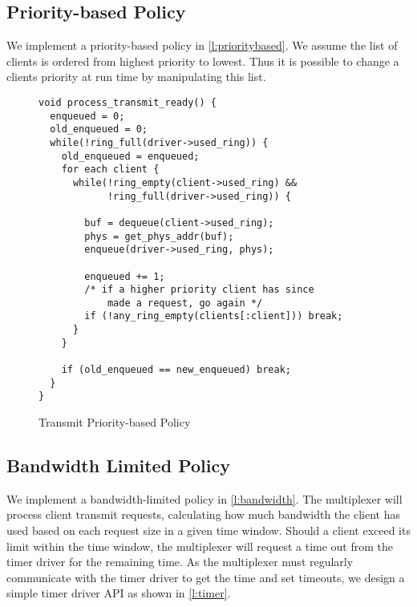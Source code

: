 \subsection{Priority-based Policy}

We implement a priority-based policy in \autoref{l:prioritybased}. We assume the list of
clients is ordered from highest priority to lowest. Thus it is possible to change a clients
priority at run time by manipulating this list.\\

\begin{figure} [H]
    \begin{verbatim}
void process_transmit_ready() {
  enqueued = 0;
  old_enqueued = 0;
  while(!ring_full(driver->used_ring)) {
    old_enqueued = enqueued;
    for each client {
      while(!ring_empty(client->used_ring) &&
            !ring_full(driver->used_ring)) {

        buf = dequeue(client->used_ring);
        phys = get_phys_addr(buf);
        enqueue(driver->used_ring, phys);

        enqueued += 1;
        /* if a higher priority client has since 
            made a request, go again */
        if (!any_ring_empty(clients[:client])) break;
      }
    }

    if (old_enqueued == new_enqueued) break;
  }
}
\end{verbatim}
\caption{Transmit Priority-based Policy}
\label{l:prioritybased}
\end{figure}

\subsection{Bandwidth Limited Policy}\label{s:bandwidth}

We implement a bandwidth-limited policy in \autoref{l:bandwidth}. The multiplexer will 
process client transmit requests, calculating how much bandwidth the client has used based on
each request size in a given time window. Should a client exceed its limit within the time window,
the multiplexer will request a time out from the timer driver for the remaining time. As the multiplexer must
regularly communicate with the timer driver to get the time and set timeouts, we design a simple timer driver
API as shown in \autoref{l:timer}. 

